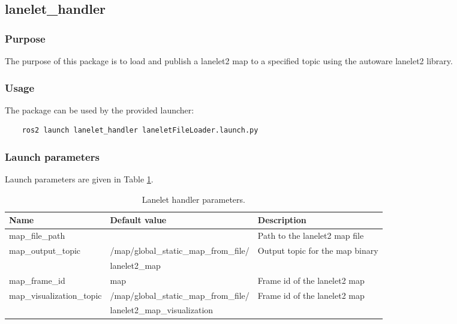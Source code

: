 \documentclass[sn-mathphys-num]{sn-jnl}%
\begin{document}
\subsection{lanelet\_handler}
\subsubsection{Purpose}
The purpose of this package is to load and publish a lanelet2 map to a specified topic using the autoware lanelet2 library.
\subsubsection{Usage}
The package can be used by the provided launcher:
\begin{lstlisting}
    ros2 launch lanelet_handler laneletFileLoader.launch.py
\end{lstlisting}


\subsubsection{Launch parameters}
Launch parameters are given in Table \ref{tab:lanelet_handler}.
\begin{table}[!h]
    \centering
    \captionsetup{justification=centering}
    \normalsize
    \caption{\label{tab:lanelet_handler} Lanelet handler parameters.}
    \begin{tabular}{| l | l | l |}
        \hline
        \textbf{Name} & \textbf{Default value} & \textbf{Description} \\
        \hline
        map\_file\_path           &                                       & Path to the lanelet2 map file \\
        \hline
        map\_output\_topic        & /map/global\_static\_map\_from\_file/ & Output topic for the map binary \\
                                  & lanelet2\_map                         &  \\
        \hline
        map\_frame\_id            & map                                   & Frame id of the lanelet2 map \\
        \hline
        map\_visualization\_topic & /map/global\_static\_map\_from\_file/ & Frame id of the lanelet2 map \\
                                  & lanelet2\_map\_visualization          &  \\
        \hline
    \end{tabular}
\end{table}

\end{document}
